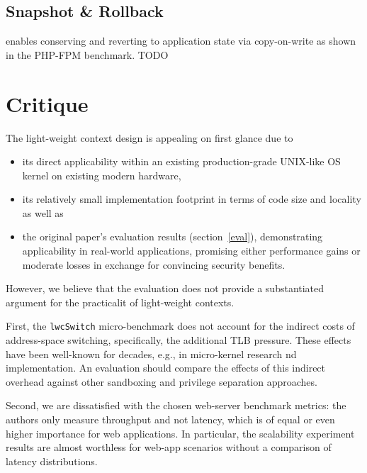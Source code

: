 \documentclass[10pt,twocolumn,letter]{article}
\begin{document}
\subsection{Snapshot \& Rollback}
enables conserving and reverting to application state via copy-on-write as shown in the PHP-FPM benchmark.
TODO

\section{Critique}\label{eval:crit}
The light-weight context design is appealing on first glance due to
\begin{itemize}
  \item its direct applicability within an existing production-grade UNIX-like OS kernel on existing modern hardware,
  \item its relatively small implementation footprint in terms of code size and locality as well as
  \item the original paper's evaluation results (section~\ref{eval}), demonstrating applicability in real-world applications, promising either performance gains or moderate losses in exchange for convincing security benefits.
\end{itemize}
However, we believe that the evaluation does not provide a substantiated argument for the practicalit of light-weight contexts.

First, the \lstinline{lwcSwitch} micro-benchmark does not account for the indirect costs of address-space switching, specifically, the additional TLB pressure.
These effects have been well-known for decades, e.g., in micro-kernel research  nd implementation. \cite{liedtke1997achievedipcperformance} 
An evaluation should compare the effects of this indirect overhead against other sandboxing and privilege separation approaches.

Second, we are dissatisfied with the chosen web-server benchmark metrics:
the authors only measure throughput and not latency, which is of equal or even higher importance for web applications.
In particular, the scalability experiment results are almost worthless for web-app scenarios without a comparison of latency distributions.
\end{document}
